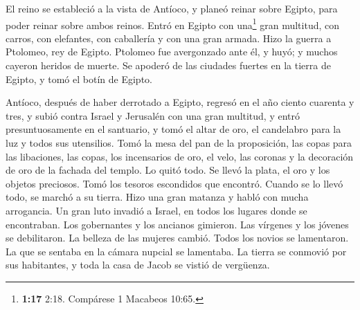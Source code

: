  El reino se estableció a la vista de Antíoco, y planeó
reinar sobre Egipto, para poder reinar sobre ambos reinos.
 Entró en Egipto con una\footnote{\textbf{1:17} 2:18.
  Compárese 1 Macabeos 10:65.} gran multitud, con carros, con elefantes,
con caballería y con una gran armada.  Hizo la guerra a
Ptolomeo, rey de Egipto. Ptolomeo fue avergonzado ante él, y huyó; y
muchos cayeron heridos de muerte.  Se apoderó de las
ciudades fuertes en la tierra de Egipto, y tomó el botín de Egipto.

 Antíoco, después de haber derrotado a Egipto, regresó en
el año ciento cuarenta y tres, y subió contra Israel y Jerusalén con una
gran multitud,  y entró presuntuosamente en el santuario,
y tomó el altar de oro, el candelabro para la luz y todos sus
utensilios.  Tomó la mesa del pan de la proposición, las
copas para las libaciones, las copas, los incensarios de oro, el velo,
las coronas y la decoración de oro de la fachada del templo. Lo quitó
todo.  Se llevó la plata, el oro y los objetos preciosos.
Tomó los tesoros escondidos que encontró.  Cuando se lo
llevó todo, se marchó a su tierra. Hizo una gran matanza y habló con
mucha arrogancia.  Un gran luto invadió a Israel, en
todos los lugares donde se encontraban.  Los gobernantes
y los ancianos gimieron. Las vírgenes y los jóvenes se debilitaron. La
belleza de las mujeres cambió.  Todos los novios se
lamentaron. La que se sentaba en la cámara nupcial se lamentaba.
 La tierra se conmovió por sus habitantes, y toda la casa
de Jacob se vistió de vergüenza.

